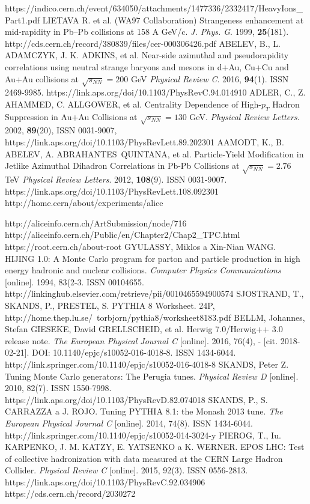 \documentclass[thesismargins, thesislinespacing]{rnthesis}
\begin{document}
\begin{thebibliography}{}
https://indico.cern.ch/event/634050/attachments/1477336/2332417/HeavyIons\_Part1.pdf
LIETAVA R.  et al. (WA97 Collaboration) Strangeness enhancement at mid-rapidity in Pb–Pb collisions at 158 A GeV/c. \textit{J. Phys. G}. 1999,  \textbf{25}(181). http://cds.cern.ch/record/380839/files/cer-000306426.pdf 
ABELEV, B., L. ADAMCZYK, J. K. ADKINS, et al. Near-side azimuthal and pseudorapidity correlations using neutral strange baryons and mesons in d+Au, Cu+Cu and Au+Au collisions at $\sqrt{s_{NN}}=200$ GeV \textit{Physical Review C}. 2016, \textbf{94}(1). ISSN 2469-9985. https://link.aps.org/doi/10.1103/PhysRevC.94.014910
ADLER, C., Z. AHAMMED, C. ALLGOWER, et al. Centrality Dependence of High-$p_T$ Hadron Suppression in Au+Au Collisions at $\sqrt{s_{NN}} = 130$ GeV. \textit{Physical Review Letters}. 2002, \textbf{89}(20), ISSN 0031-9007, https://link.aps.org/doi/10.1103/PhysRevLett.89.202301
AAMODT, K., B. ABELEV, A. ABRAHANTES QUINTANA, et al. Particle-Yield Modification in Jetlike Azimuthal Dihadron Correlations in Pb-Pb Collisions at $\sqrt{s_{NN}} = 2.76$ TeV \textit{Physical Review Letters}. 2012, \textbf{108}(9). ISSN 0031-9007. https://link.aps.org/doi/10.1103/PhysRevLett.108.092301
http://home.cern/about/experiments/alice

http://aliceinfo.cern.ch/ArtSubmission/node/716
http://aliceinfo.cern.ch/Public/en/Chapter2/Chap2\_TPC.html
https://root.cern.ch/about-root 
GYULASSY, Miklos a Xin-Nian WANG. HIJING 1.0: A Monte Carlo program for parton and particle production in high energy hadronic and nuclear collisions. \textit{Computer Physics Communications} [online]. 1994, 83(2-3. ISSN 00104655. http://linkinghub.elsevier.com/retrieve/pii/0010465594900574
SJOSTRAND, T., SKANDS, P., PRESTEL, S. PYTHIA 8 Worksheet. 24P, http://home.thep.lu.se/~torbjorn/pythia8/worksheet8183.pdf
BELLM, Johannes, Stefan GIESEKE, David GRELLSCHEID, et al. Herwig 7.0/Herwig++ 3.0 release note. \textit{The European Physical Journal C} [online]. 2016, 76(4), - [cit. 2018-02-21]. DOI: 10.1140/epjc/s10052-016-4018-8. ISSN 1434-6044. http://link.springer.com/10.1140/epjc/s10052-016-4018-8
SKANDS, Peter Z. Tuning Monte Carlo generators: The Perugia tunes. \textit{Physical Review D }[online]. 2010, 82(7). ISSN 1550-7998. https://link.aps.org/doi/10.1103/PhysRevD.82.074018
SKANDS, P., S. CARRAZZA a J. ROJO. Tuning PYTHIA 8.1: the Monash 2013 tune. \textit{The European Physical Journal C} [online]. 2014, 74(8). ISSN 1434-6044. http://link.springer.com/10.1140/epjc/s10052-014-3024-y
PIEROG, T., Iu. KARPENKO, J. M. KATZY, E. YATSENKO a K. WERNER. EPOS LHC: Test of collective hadronization with data measured at the CERN Large Hadron Collider. \textit{Physical Review C} [online]. 2015, 92(3). ISSN 0556-2813.
 https://link.aps.org/doi/10.1103/PhysRevC.92.034906
 https://cds.cern.ch/record/2030272
\end{thebibliography}
%
\end{document}
